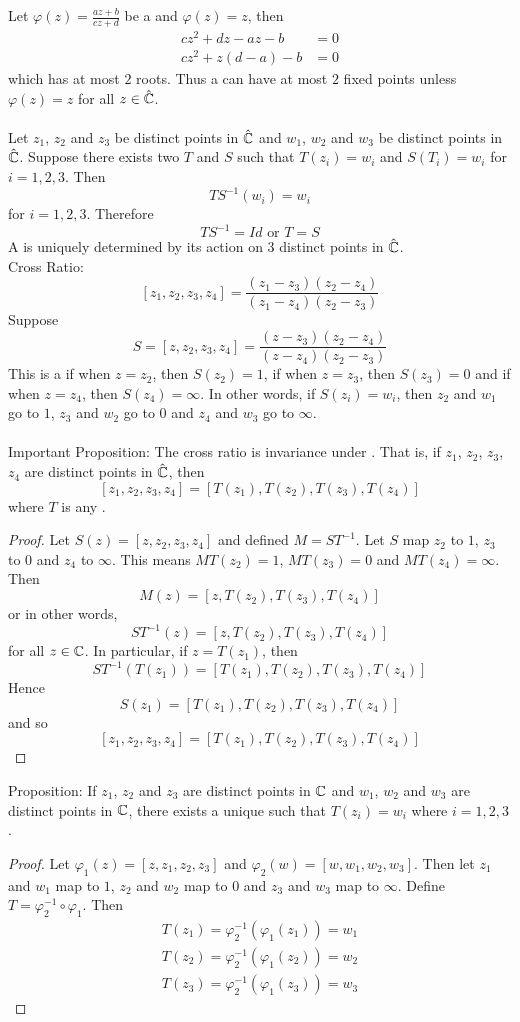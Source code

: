 \documentclass[12pt]{article}
\begin{document}
Let $\varphi(z) = \frac{az+b}{cz+d}$ be a \mobt and $\varphi(z) = z$, then $$ \begin{aligned} cz^2 + dz - az - b &= 0 \\ cz^2 + z(d-a) - b &= 0 \end{aligned}$$ which has at most $2$ roots. Thus a \mobt can have at most $2$ fixed points unless $\varphi(z) = z$ for all $z \in \hat{\mathbb{C}}$. \\~\\
Let $z_1$, $z_2$ and $z_3$ be distinct points in $\hat{\mathbb{C}}$ and $w_1$, $w_2$ and $w_3$ be distinct points in $\hat{\mathbb{C}}$. Suppose there exists two \mobt $T$ and $S$ such that $T(z_i) = w_i$ and $S(T_i) = w_i$ for $i=1,2,3$. Then $$TS^{-1}(w_i) = w_i $$ for $i=1,2,3$. Therefore $$TS^{-1} = Id \text{ or } T = S $$ 
A \mobt is uniquely determined by its action on $3$ distinct points in $\hat{\mathbb{C}}$. \\
Cross Ratio: $$ [z_1,z_2,z_3,z_4] = \frac{(z_1-z_3)(z_2-z_4)}{(z_1-z_4)(z_2 - z_3)} $$ 
Suppose $$S = [z,z_2,z_3,z_4] = \frac{(z-z_3)(z_2 - z_4)}{(z-z_4)(z_2-z_3)}$$
This is a \mobt if when $z=z_2$, then $S(z_2) = 1$, if when $z=z_3$, then $S(z_3) = 0$ and if when $z=z_4$, then $S(z_4) = \infty$. In other words, if $S(z_i) = w_i$, then $z_2$ and $w_1$ go to $1$, $z_3$ and $w_2$ go to $0$ and $z_4$ and $w_3$ go to $\infty$. \\~\\
Important Proposition: The cross ratio is invariance under \mobt. That is, if $z_1$, $z_2$, $z_3$, $z_4$ are distinct points in $\hat{\mathbb{C}}$, then $$[z_1,z_2,z_3,z_4] = [T(z_1), T(z_2), T(z_3), T(z_4)]$$ where $T$ is any \mobt. \\
\begin{proof} Let $S(z) = [z,z_2,z_3,z_4]$ and defined $M = ST^{-1}$. Let $S$ map $z_2$ to $1$, $z_3$ to $0$ and $z_4$ to $\infty$. This means $MT(z_2) = 1$, $MT(z_3) = 0$ and $MT(z_4) = \infty$. Then $$M(z) = [z,T(z_2), T(z_3), T(z_4)]$$ or in other words, $$ST^{-1}(z) = [z,T(z_2),T(z_3),T(z_4)] $$ for all $z\in \mathbb{C}$. In particular, if $z = T(z_1)$, then $$ST^{-1}(T(z_1)) = [T(z_1), T(z_2),T(z_3),T(z_4)]$$ Hence $$S(z_1) = [T(z_1),T(z_2),T(z_3),T(z_4)]$$ and so $$[z_1,z_2,z_3,z_4] = [T(z_1),T(z_2),T(z_3),T(z_4)]$$ \end{proof}
Proposition: If $z_1$, $z_2$ and $z_3$ are distinct points in $\mathbb{C}$ and $w_1$, $w_2$ and $w_3$ are distinct points in $\mathbb{C}$, there exists a unique \mobt such that $T(z_i) = w_i$ where $i =1,2,3$. \\
\begin{proof} Let $\varphi_1(z) = [z,z_1,z_2,z_3]$ and $\varphi_2(w) = [w,w_1,w_2,w_3]$. Then let $z_1$ and $w_1$ map to $1$, $z_2$ and $w_2$ map to $0$ and $z_3$ and $w_3$ map to $\infty$. Define $T = \varphi_2^{-1} \circ \varphi_1$. Then $$\begin{aligned} T(z_1) = \varphi_2^{-1}(\varphi_1(z_1)) = w_1 \\ T(z_2) = \varphi_2^{-1}(\varphi_1(z_2)) = w_2 \\ T(z_3) = \varphi_2^{-1}(\varphi_1(z_3)) = w_3 \end{aligned} $$ \end{proof}
\end{document}
